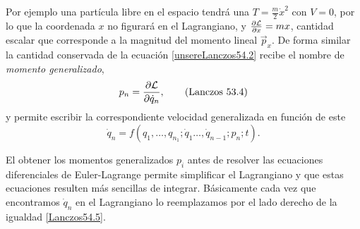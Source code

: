 \documentclass[12pt, spanish, a4paper, ]{article}
\begin{document}
Por ejemplo una partícula libre en el espacio tendrá una \(T= \frac{m}{2} \dot{x}^2\) con \(V = 0\), por lo que la coordenada \(x\) no figurará en el Lagrangiano, y \(\pdv{\mathcal{L}}{x}= m x\), cantidad escalar que corresponde a la magnitud del momento lineal \(\vec{p}_x\).
De forma similar la cantidad conservada de la ecuación \eqref{unsereLanczos54.2} recibe el nombre de \emph{momento generalizado},
\begin{equation}\label{Lanczos53.4}
	p_n= \pdv{\mathcal{L}}{\dot{q}_n},
    \tag{Lanczos 53.4}
\end{equation}
y permite escribir la correspondiente velocidad generalizada en función de este
\begin{equation}\label{Lanczos54.5}
	\dot{q}_n= f(q_1, \ldots, q_{n_1};\dot{q}_1 \ldots, \dot{q}_{n-1};p_n;t).
    \tag{Lanczos 54.5}
\end{equation}

El obtener los momentos generalizados \(p_i\) antes de resolver las ecuaciones diferenciales de Euler-Lagrange permite simplificar el Lagrangiano y que estas ecuaciones resulten más sencillas de integrar.
Básicamente cada vez que encontramos \(\dot{q}_n\) en el Lagrangiano lo reemplazamos por el lado derecho de la igualdad \eqref{Lanczos54.5}.


%
%
%
\end{document}
